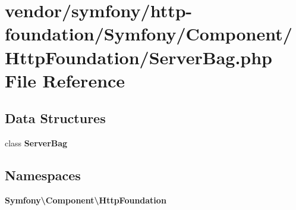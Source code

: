 \section{vendor/symfony/http-\/foundation/\+Symfony/\+Component/\+Http\+Foundation/\+Server\+Bag.php File Reference}
\label{_server_bag_8php}
\subsection*{Data Structures}
\begin{DoxyCompactItemize}
\item 
class {\bf Server\+Bag}
\end{DoxyCompactItemize}
\subsection*{Namespaces}
\begin{DoxyCompactItemize}
\item 
 {\bf Symfony\textbackslash{}\+Component\textbackslash{}\+Http\+Foundation}
\end{DoxyCompactItemize}
